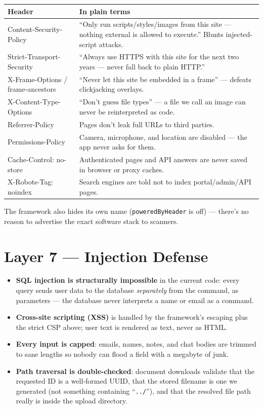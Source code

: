 \documentclass[11pt,letterpaper]{report}
\begin{document}
\begin{center}
\begin{tabularx}{\textwidth}{lX}
\toprule
\textbf{Header} & \textbf{In plain terms} \\
\midrule
Content-Security-Policy & ``Only run scripts/styles/images from this site ---
nothing external is allowed to execute.'' Blunts injected-script attacks. \\
Strict-Transport-Security & ``Always use HTTPS with this site for the next two
years --- never fall back to plain HTTP.'' \\
X-Frame-Options / frame-ancestors & ``Never let this site be embedded in a
frame'' --- defeats clickjacking overlays. \\
X-Content-Type-Options & ``Don't guess file types'' --- a file we call an image
can never be reinterpreted as code. \\
Referrer-Policy & Pages don't leak full URLs to third parties. \\
Permissions-Policy & Camera, microphone, and location are disabled --- the app
never asks for them. \\
Cache-Control: no-store & Authenticated pages and API answers are never saved
in browser or proxy caches. \\
X-Robots-Tag: noindex & Search engines are told not to index portal/admin/API
pages. \\
\bottomrule
\end{tabularx}
\end{center}

The framework also hides its own name (\texttt{poweredByHeader} is off) ---
there's no reason to advertise the exact software stack to scanners.

\section{Layer 7 --- Injection Defense}

\begin{itemize}[leftmargin=1.4em]
  \item \textbf{SQL injection is structurally impossible} in the current code:
        every query sends user data to the database \emph{separately} from the
        command, as parameters --- the database never interprets a name or
        email as a command.
  \item \textbf{Cross-site scripting (XSS)} is handled by the framework's
        escaping plus the strict CSP above; user text is rendered as text,
        never as HTML.
  \item \textbf{Every input is capped}: emails, names, notes, and chat bodies
        are trimmed to sane lengths so nobody can flood a field with a
        megabyte of junk.
  \item \textbf{Path traversal is double-checked}: document downloads validate
        that the requested ID is a well-formed UUID, that the stored filename is
        one we generated (not something containing ``\texttt{../}''), and that
        the resolved file path really is inside the upload directory.
\end{itemize}
\end{document}
